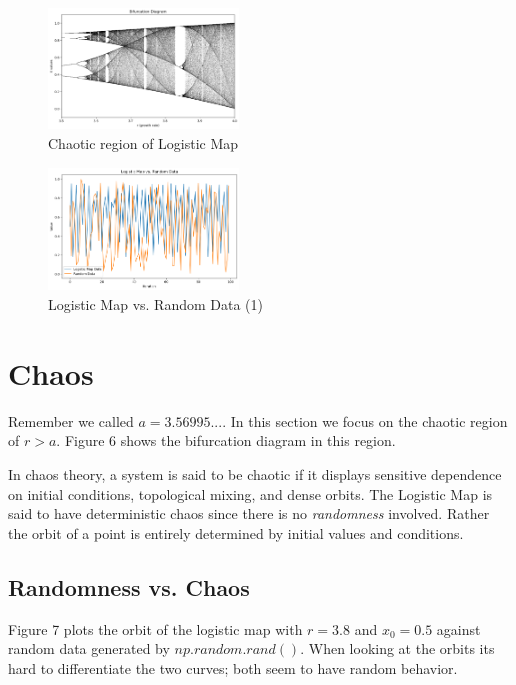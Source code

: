 \documentclass[11pt,twocolumn]{article}
\begin{document}
\begin{figure}
    \centering
\includegraphics[width=0.45\textwidth]{figures/chaosregion.png}
    \caption{Chaotic region of Logistic Map}
    \label{fig:enter-label}
\end{figure}
\begin{figure}
    \centering
\includegraphics[width=0.45\textwidth]{figures/logvsrand.png}
    \caption{Logistic Map vs. Random Data (1)}
    \label{fig:enter-label}
\end{figure}



\section{Chaos}
Remember we called $a=3.56995...$.
In this section we focus on the chaotic region of $r>a$.
Figure 6 shows the bifurcation diagram in this region.

In chaos theory, a system is said to be chaotic if it displays sensitive dependence on initial conditions, topological mixing, and dense orbits.
The Logistic Map is said to have deterministic chaos since there is no \emph{randomness} involved. Rather the orbit of a point is entirely determined by initial values and conditions.
\cite[p.~252]{AlligoodSauerYorke}
\subsection{Randomness vs. Chaos}
Figure 7 plots the orbit of the logistic map with $r=3.8$ and $x_0=0.5$ against random data generated by $np.random.rand()$.
When looking at the orbits its hard to differentiate the two curves; both seem to have random behavior. 
\end{document}
